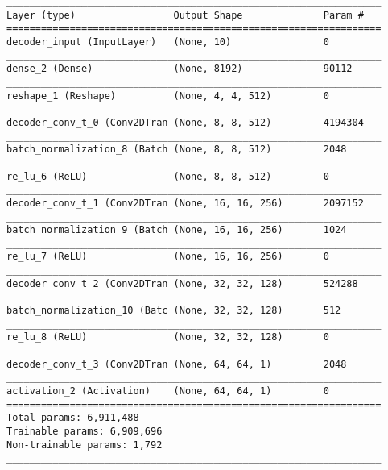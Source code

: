 \begin{lstlisting}[caption={dSprites-\ac{VAE}-\ac{GAN} Decoder},captionpos=b,basicstyle=\tiny, label={lst:mnist-vae-decoder}]
_________________________________________________________________
Layer (type)                 Output Shape              Param #
=================================================================
decoder_input (InputLayer)   (None, 10)                0
_________________________________________________________________
dense_2 (Dense)              (None, 8192)              90112
_________________________________________________________________
reshape_1 (Reshape)          (None, 4, 4, 512)         0
_________________________________________________________________
decoder_conv_t_0 (Conv2DTran (None, 8, 8, 512)         4194304
_________________________________________________________________
batch_normalization_8 (Batch (None, 8, 8, 512)         2048
_________________________________________________________________
re_lu_6 (ReLU)               (None, 8, 8, 512)         0
_________________________________________________________________
decoder_conv_t_1 (Conv2DTran (None, 16, 16, 256)       2097152
_________________________________________________________________
batch_normalization_9 (Batch (None, 16, 16, 256)       1024
_________________________________________________________________
re_lu_7 (ReLU)               (None, 16, 16, 256)       0
_________________________________________________________________
decoder_conv_t_2 (Conv2DTran (None, 32, 32, 128)       524288
_________________________________________________________________
batch_normalization_10 (Batc (None, 32, 32, 128)       512
_________________________________________________________________
re_lu_8 (ReLU)               (None, 32, 32, 128)       0
_________________________________________________________________
decoder_conv_t_3 (Conv2DTran (None, 64, 64, 1)         2048
_________________________________________________________________
activation_2 (Activation)    (None, 64, 64, 1)         0
=================================================================
Total params: 6,911,488
Trainable params: 6,909,696
Non-trainable params: 1,792
_________________________________________________________________
\end{lstlisting}